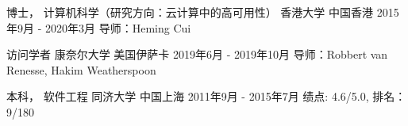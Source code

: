 

\begin{cventries}


\cventry
{博士， 计算机科学（研究方向：云计算中的高可用性）} %
{香港大学} %
{中国香港} %
{2015年9月 - 2020年3月} %
{ %
导师：Heming Cui
}


\cventry
{访问学者} %
{康奈尔大学} %
{美国伊萨卡} %
{2019年6月 - 2019年10月} %
{ %
导师：Robbert van Renesse, Hakim Weatherspoon
}


\cventry
{本科， 软件工程} %
{同济大学} %
{中国上海} %
{2011年9月 - 2015年7月} %
{ %
绩点: 4.6/5.0, 排名：9/180
}

\end{cventries}

